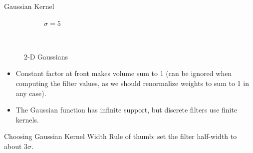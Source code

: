 \begin{frame}{Gaussian Kernel}
\begin{figure}
\begin{subfigure}[b]{0.3\textwidth}
            \caption{$\sigma = 5$}
            \label{sfi:gaussian_2d_5}
        \end{subfigure}\\
        \caption{2-D Gaussians}\label{fi:gaussians}
    \end{figure}
    \begin{itemize}
      \item Constant factor at front makes volume sum to 1 (can be ignored when computing the filter values, as we should renormalize weights to sum to 1 in any case).
      \item The Gaussian function has infinite support, but discrete filters use finite kernels.
    \end{itemize}



\end{frame}


\begin{frame}[fragile]{Choosing Gaussian Kernel Width}
Rule of thumb: set the filter half-width to about $3\sigma$.

\end{frame}


